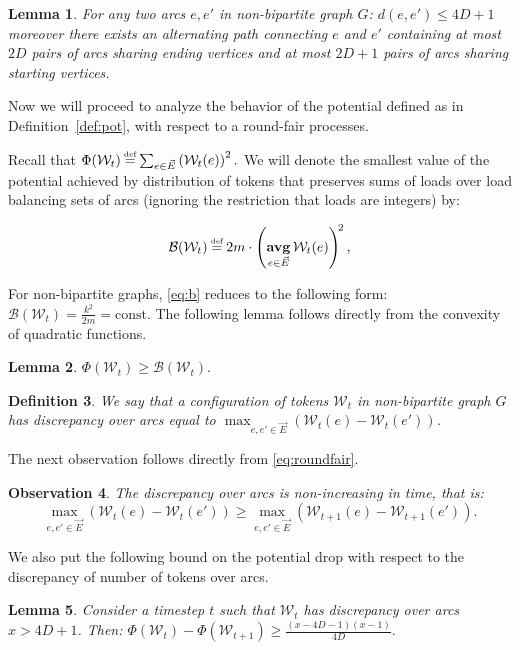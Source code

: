 \documentclass{article}[11pt,letter]
\newtheorem{definition}{Definition}[section]
\newtheorem{lemma}[definition]{Lemma}
\newtheorem{observation}[definition]{Observation}
\newcommand{\wload}{\mathcal{W}}
\newcommand{\const}{\mathrm{const}}
\newcommand\defeq{\stackrel{\mathclap{\normalfont{\mbox{\text{\tiny{def}}}}}}{=}}
\DeclareMathOperator*{\avg}{\mathbf{avg}}
\begin{document}
\begin{lemma}
\label{lem:even_length}
For any two arcs $e,e'$ in non-bipartite graph $G$:
$d(e,e') \le 4D+1$
moreover there exists an alternating path connecting $e$ and $e'$ containing at most $2D$ pairs of arcs sharing ending vertices and at most $2D+1$ pairs of arcs sharing starting vertices.
\end{lemma}

Now we will proceed to analyze the behavior of the potential defined as in Definition~\ref{def:pot},
with respect to a round-fair processes.

Recall that $\Phi(\wload_t) \defeq \sum_{e \in \vec{E}} \left(\wload_t(e)\right)^2.$
We will denote the smallest value of the potential achieved by distribution of tokens that preserves sums of loads over load balancing sets of arcs (ignoring the restriction that loads are integers) by:

\begin{equation}\label{eq:b}\mathcal{B}(\wload_t) \defeq 2m\cdot\left( \avg_{e \in \vec{E}} \wload_t(e)\right)^{\!2},\end{equation}

For non-bipartite graphs, \eqref{eq:b} reduces to the following form: $\mathcal{B}(\wload_t) = \frac{k^2}{2m} = \const.$ The following lemma follows directly from the convexity of quadratic functions.

\begin{lemma}
$\Phi(\wload_t) \ge \mathcal{B}(\wload_t).$
\end{lemma}

\begin{definition}
\label{def:discr}
We say that a configuration of tokens $\wload_t$ in non-bipartite graph $G$ has discrepancy over arcs equal to $\max_{e,e' \in \vec{E}} (\wload_t(e) - \wload_t(e'))$.
\end{definition}

The next observation follows directly from \eqref{eq:roundfair}.
\begin{observation}
The discrepancy over arcs is non-increasing in time, that is:
$$\max_{e,e' \in \vec{E}} (\wload_t(e) - \wload_t(e')) \ge \max_{e,e' \in \vec{E}} (\wload_{t+1}(e) - \wload_{t+1}(e')).$$
\end{observation}

We also put the following bound on the potential drop with respect to the discrepancy of number of tokens over arcs.
\begin{lemma}
\label{lem:potdrop}
Consider a timestep $t$ such that $\mathcal{W}_t$ has discrepancy over arcs $x>4D+1$.
Then:
$\Phi(\wload_t) - \Phi(\wload_{t+1}) \ge \frac{(x-4D-1)(x-1)}{4D}.$
\end{lemma}
\end{document}
